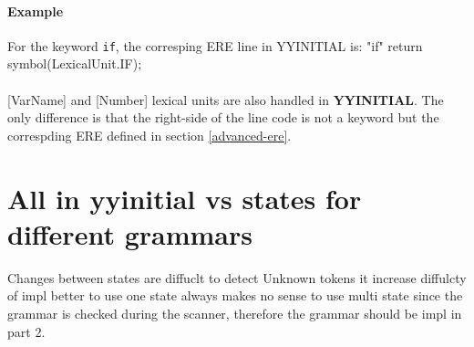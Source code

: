 \documentclass[letterpaper]{article}
\begin{document}
\paragraph{Example}

For the keyword \texttt{if}, the corresping ERE line in YYINITIAL is:
"if"             {return symbol(LexicalUnit.IF);}

\paragraph{}
[VarName] and [Number] lexical units are also handled in \textbf{YYINITIAL}.
The only difference is that the right-side of the line code is not a keyword
but the correspding ERE defined in section \ref{advanced-ere}.



\section{All in yyinitial vs states for different grammars}

Changes between states are diffuclt to detect Unknown tokens
it increase diffulcty of impl
better to use one state
always makes no sense to use multi state since the grammar is checked
during the scanner, therefore the grammar should be impl in part 2.
\end{document}
